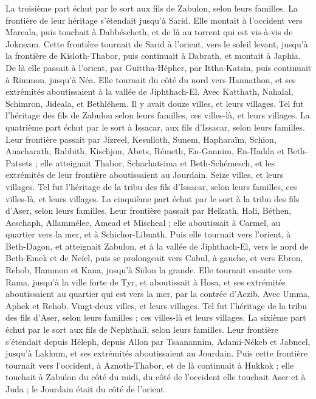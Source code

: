 \begin{multicols}{2}
La troisième part échut par le sort aux fils de Zabulon, selon leurs familles.
La frontière de leur héritage s’étendait jusqu’à Sarid. Elle montait à l’occident vers Mareala, puis touchait à Dabbéscheth, et de là au torrent qui est vis-à-vis de Jokneam.
Cette frontière tournait de Sarid à l’orient, vers le soleil levant, jusqu’à la frontière de Kisloth-Thabor, puis continuait à Dabrath, et montait à Japhia.
De là elle passait à l’orient, par Guittha-Hépher, par Ittha-Katsin, puis continuait à Rimmon, jusqu’à Néa.
Elle tournait du côté du nord vers Hannathon, et ses extrémités aboutissaient à la vallée de Jiphthach-El.
Avec Katthath, Nahalal, Schimron, Jideala, et Bethléhem. Il y avait douze villes, et leurs villages.
Tel fut l’héritage des fils de Zabulon selon leurs familles, ces villes-là, et leurs villages.
La quatrième part échut par le sort à Issacar, aux fils d’Issacar, selon leurs familles.
Leur frontière passait par Jizreel, Kesulloth, Sunem,
Hapharaïm, Schion, Anacharath,
Rabbith, Kischjon, Abets,
Rémeth, En-Gannim, En-Hadda et Beth-Patsets ;
elle atteignait Thabor, Schachatsima et Beth-Schémesch, et les extrémités de leur frontière aboutissaient au Jourdain. Seize villes, et leurs villages.
Tel fut l’héritage de la tribu des fils d’Issacar, selon leurs familles, ces villes-là, et leurs villages.
La cinquième part échut par le sort à la tribu des fils d’Aser, selon leurs familles.
Leur frontière passait par Helkath, Hali, Béthen, Acschaph,
Allammélec, Amead et Mischeal ; elle aboutissait à Carmel, au quartier vers la mer, et à Schichor-Libnath.
Puis elle tournait vers l’orient, à Beth-Dagon, et atteignait Zabulon, et à la vallée de Jiphthach-El, vers le nord de Beth-Emek et de Neïel, puis se prolongeait vers Cabul, à gauche,
et vers Ebron, Rehob, Hammon et Kana, jusqu’à Sidon la grande.
Elle tournait ensuite vers Rama, jusqu’à la ville forte de Tyr, et aboutissait à Hosa, et ses extrémités aboutissaient au quartier qui est vers la mer, par la contrée d’Aczib.
Avec Umma, Aphek et Rehob. Vingt-deux villes, et leurs villages.
Tel fut l’héritage de la tribu des fils d’Aser, selon leurs familles ; ces villes-là et leurs villages.
La sixième part échut par le sort aux fils de Nephthali, selon leurs familles.
Leur frontière s’étendait depuis Héleph, depuis Allon par Tsaanannim, Adami-Nékeb et Jabneel, jusqu’à Lakkum, et ses extrémités aboutissaient au Jourdain.
Puis cette frontière tournait vers l’occident, à Aznoth-Thabor, et de là continuait à Hukkok ; elle touchait à Zabulon du côté du midi, du côté de l’occident elle touchait Aser et à Juda ; le Jourdain était du côté de l’orient.

\end{multicols}
